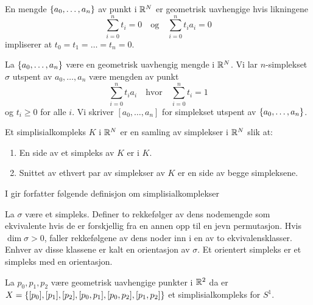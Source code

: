 \begin{definisjon}\label{def:GeoUav}
  En mengde $\left\{a_0,\dots,a_n\right\}$ av punkt i $\mathbb{R}^N$ er
  geometrisk uavhengige hvis likningene
  \[\sum_{i=0}^nt_i
  = 0\quad\text{og}\quad\sum_{i=0}^nt_ia_i=0\]
  impliserer at $t_0=t_1=\dots=t_n=0$.
\end{definisjon}

\begin{definisjon}\label{def:n-simp} 
  La $\left\{a_0,\dots,a_n\right\}$ være en geometrisk uavhengig mengde
  i $\mathbb{R}^N$. Vi lar $n$-simplekset $\sigma$ utspent av
  $a_0,\dots,a_n$ være mengden av punkt
  \[\sum_{i=0}^nt_ia_i\quad\text{hvor}\quad\sum_{i=0}^nt_i = 1\]
  og $t_i\geq0$ for alle $i$. Vi skriver $[a_0,\dots,a_n]$ for
  simplekset utspent av $\left\{a_0,\dots,a_n\right\}$.
\end{definisjon}

\begin{definisjon}\label{def:SimpKomp}
  Et simplisialkompleks $K$ i $\mathbb{R}^N$ er en samling av simplekser
  i $\mathbb{R}^N$ slik at:
  \begin{enumerate}
    \item En side av et simpleks av $K$ er i $K$.\\
    \item Snittet av ethvert par av simplekser av $K$ er en side
      av begge simpleksene.
  \end{enumerate}
\end{definisjon}

I \citep[seksjon 5]{MunkresJamesR.2018EOAT} gir forfatter følgende
definisjon om simplisialkomplekser

\begin{definisjon}\label{def:Orientering}
  La $\sigma$ være et simpleks. Definer to rekkefølger av dens
  nodemengde som ekvivalente hvis de er forskjellig fra en annen
  opp til en jevn permutasjon. Hvis $\dim\sigma>0$, faller
  rekkefølgene av dens noder inn i en av to ekvivalensklasser.
  Enhver av disse klassene er kalt en orientasjon av $\sigma$. Et
  orientert simpleks er et simpleks med en orientasjon.
\end{definisjon}

\begin{eksempel}\label{eks:Sirkel}
  La $p_0,p_1,p_2$ være geometrisk uavhengige punkter
  i $\mathbb{R}^2$ da er $X
  = \left\{[p_0],[p_1],[p_2],[p_0,p_1],[p_0,p_2],[p_1,p_2]\right\}$ et
  simplisialkompleks for $S^1$.
\end{eksempel}


